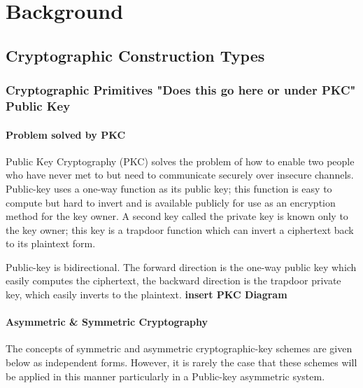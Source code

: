 \chapter{Background}

\section{Cryptographic Construction Types}

\subsection{Cryptographic Primitives "Does this go here or under PKC" Public Key}

\subsubsection{Problem solved by PKC}

Public Key Cryptography (PKC) solves the problem of how to enable two people who have never met to but need to communicate securely over insecure channels. 
Public-key uses a one-way function as its public key; this function is easy to compute but hard to invert and is available publicly for use as an encryption method for the key owner. A second key called the private key is known only to the
key owner; this key is a trapdoor function which can invert a ciphertext back to its plaintext form. 

Public-key is bidirectional. The forward direction is the one-way public key which easily computes the ciphertext, the backward direction is the trapdoor private key,
which easily inverts to the plaintext. 
\textbf{insert PKC Diagram}

\subsubsection{Asymmetric & Symmetric Cryptography} 

The concepts of symmetric and asymmetric cryptographic-key schemes are given below as independent forms. However, it is rarely the case that these schemes will be applied in this manner particularly in a Public-key asymmetric system.


